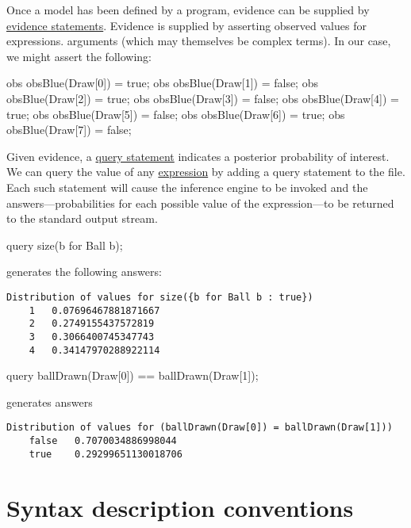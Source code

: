 \documentclass[12pt]{article}
\begin{document}
Once a model has been defined by a \bl program, evidence can be
supplied by \hyperref[evidence-section]{evidence statements}.  
Evidence is supplied by asserting observed values for expressions.
arguments (which may themselves be complex terms). In our case, we might 
assert the following:
\begin{blogcode}
obs obsBlue(Draw[0]) = true;
obs obsBlue(Draw[1]) = false;
obs obsBlue(Draw[2]) = true;
obs obsBlue(Draw[3]) = false;
obs obsBlue(Draw[4]) = true;
obs obsBlue(Draw[5]) = false;
obs obsBlue(Draw[6]) = true;
obs obsBlue(Draw[7]) = false;
\end{blogcode}
Given
evidence, a \hyperref[query-section]{query statement} indicates a
posterior probability of interest. We can query the value of any \hyperref[expression-section]{expression}
by adding a query statement to the file. Each such statement will cause the inference engine to be invoked 
and the answers---probabilities for each possible value of the
expression---to be returned to the standard output stream.
\begin{blogcode}
query size({b for Ball b});
\end{blogcode}
generates the following answers:
\begin{verbatim}
Distribution of values for size({b for Ball b : true})
	1	0.07696467881871667
	2	0.2749155437572819
	3	0.3066400745347743
	4	0.34147970288922114
\end{verbatim}
\begin{blogcode}
query ballDrawn(Draw[0]) == ballDrawn(Draw[1]);
\end{blogcode}
generates answers
\begin{verbatim}
Distribution of values for (ballDrawn(Draw[0]) = ballDrawn(Draw[1]))
	false	0.7070034886998044
	true	0.29299651130018706
\end{verbatim}


\section{Syntax description conventions}\label{convention-section}
\end{document}
